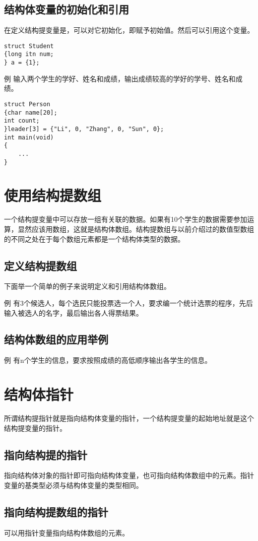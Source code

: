 \subsection{结构体变量的初始化和引用}
在定义结构提变量是，可以对它初始化，即赋予初始值。然后可以引用这个变量。
\begin{lstlisting}
struct Student
{long itn num;
} a = {1};
\end{lstlisting}

例 输入两个学生的学好、姓名和成绩，输出成绩较高的学好的学号、姓名和成绩。
\begin{lstlisting}
struct Person
{char name[20];
int count;
}leader[3] = {"Li", 0, "Zhang", 0, "Sun", 0};
int main(void)
{
	...
}
\end{lstlisting}
\section{使用结构提数组}
一个结构提变量中可以存放一组有关联的数据。如果有10个学生的数据需要参加运算，显然应该用数组，这就是结构体数组。结构提数组与以前介绍过的数值型数组的不同之处在于每个数组元素都是一个结构体类型的数据。
\subsection{定义结构提数组}
下面举一个简单的例子来说明定义和引用结构体数组。

例 有3个候选人，每个选民只能投票选一个人，要求编一个统计选票的程序，先后输入被选人的名字，最后输出各人得票结果。
\subsection{结构体数组的应用举例}
例 有n个学生的信息，要求按照成绩的高低顺序输出各学生的信息。
\section{结构体指针}
所谓结构提指针就是指向结构体变量的指针，一个结构提变量的起始地址就是这个结构提变量的指针。
\subsection{指向结构提的指针}
指向结构体对象的指针即可指向结构体变量，也可指向结构体数组中的元素。指针变量的基类型必须与结构体变量的类型相同。
\subsection{指向结构提数组的指针}
可以用指针变量指向结构体数组的元素。
